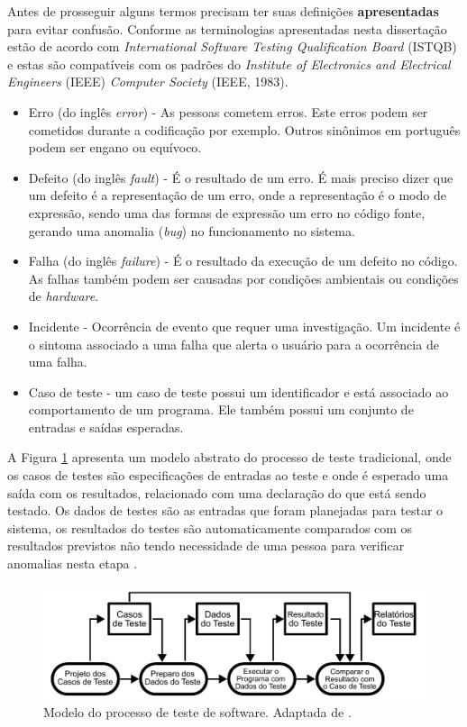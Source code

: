 Antes de prosseguir alguns termos precisam ter suas definições \textbf{apresentadas} para evitar confusão. Conforme \cite{jorgensen2016software} as terminologias apresentadas nesta dissertação estão de acordo com \textit{International Software Testing Qualification Board} (ISTQB) e estas são compatíveis com os padrões do \textit{Institute of Electronics and Electrical Engineers} (IEEE) \textit{Computer Society} (IEEE, 1983).

\begin{itemize}
\item Erro (do inglês \textit{error}) - As pessoas cometem erros. Este erros podem ser cometidos durante a codificação por exemplo. Outros sinônimos em português podem ser engano ou equívoco.
\item Defeito (do inglês \textit{fault}) -  É o resultado de um erro. É mais preciso dizer que um defeito é a representação de um erro, onde a representação é o modo de expressão, sendo uma das formas de expressão um erro no código fonte, gerando uma anomalia (\textit{bug}) no funcionamento no sistema.
\item Falha (do inglês \textit{failure}) - É o resultado da execução de um defeito no código. As falhas também podem ser causadas por condições ambientais ou condições de \textit{hardware}.
\item Incidente - Ocorrência de evento que requer uma investigação. Um incidente é o sintoma associado a uma falha que alerta o usuário para a ocorrência de uma falha.
\item Caso de teste - um caso de teste possui um identificador e está associado ao comportamento de um programa. Ele também possui um conjunto de entradas e saídas esperadas.
\end{itemize}

A Figura \ref{fig:processo_teste} apresenta um modelo abstrato do processo de teste tradicional, onde os casos de testes são especificações de entradas ao teste e onde é esperado uma saída com os resultados,  relacionado com uma declaração do que está sendo testado. Os dados de testes são as entradas que foram planejadas para testar o sistema, os resultados do testes são automaticamente comparados com os resultados previstos não tendo necessidade de uma pessoa para verificar anomalias nesta etapa \cite{sommerville2010}.

\begin{figure}[ht]
\centering
\includegraphics[scale=0.7]{imagens/processo_teste.pdf}
\caption{Modelo do processo de teste de software. Adaptada de \cite{sommerville2010}.}
\label{fig:processo_teste}
\end{figure}

